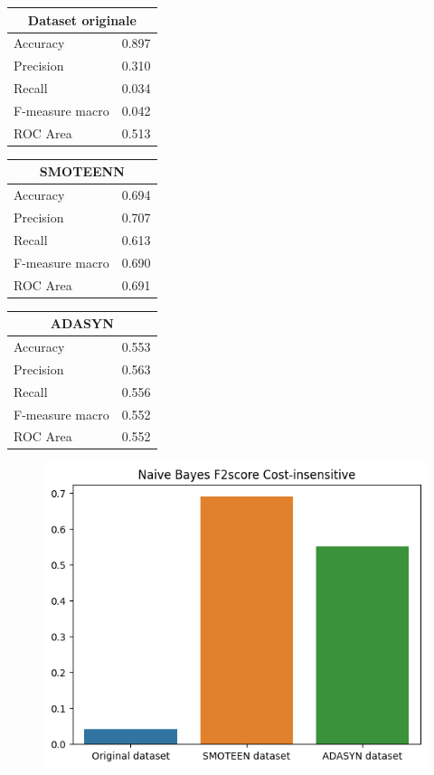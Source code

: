 \documentclass[italian,12pt,a4paper]{article}
\begin{document}
	
	\begin{center}
		
		\begin{table}[h]
			\footnotesize
			\begin{tabular}{|p{2cm}|c|}
				\hline
				\multicolumn{2}{|c|}{Dataset originale}\\ \hline
				Accuracy & 0.897 \\ \hline
				Precision & 0.310 \\ \hline
				Recall & 0.034 \\ \hline
				F-measure macro & 0.042 \\ \hline
				ROC Area & 0.513 \\ \hline  
			\end{tabular}
			\hfill
			\begin{tabular}{|p{2cm}|c|}
				\hline
				\multicolumn{2}{|c|}{SMOTEENN}\\ \hline
				Accuracy & 0.694 \\ \hline
				Precision & 0.707 \\ \hline
				Recall & 0.613 \\ \hline
				F-measure macro & 0.690 \\ \hline
				ROC Area & 0.691 \\ \hline  
			\end{tabular}
			\hfill
			\begin{tabular}{|p{2cm}|r|} \hline
				\multicolumn{2}{|c|}{ADASYN}\\ \hline
				Accuracy & 0.553 \\ \hline
				Precision & 0.563 \\ \hline
				Recall & 0.556 \\ \hline
				F-measure macro & 0.552 \\ \hline
				ROC Area & 0.552 \\ \hline  
			\end{tabular}
		\end{table} 
		\begin{figure}[h]
			\centering
			\includegraphics[scale=0.73]{Bayes}
		\end{figure}
	\end{center}
	
\end{document}
